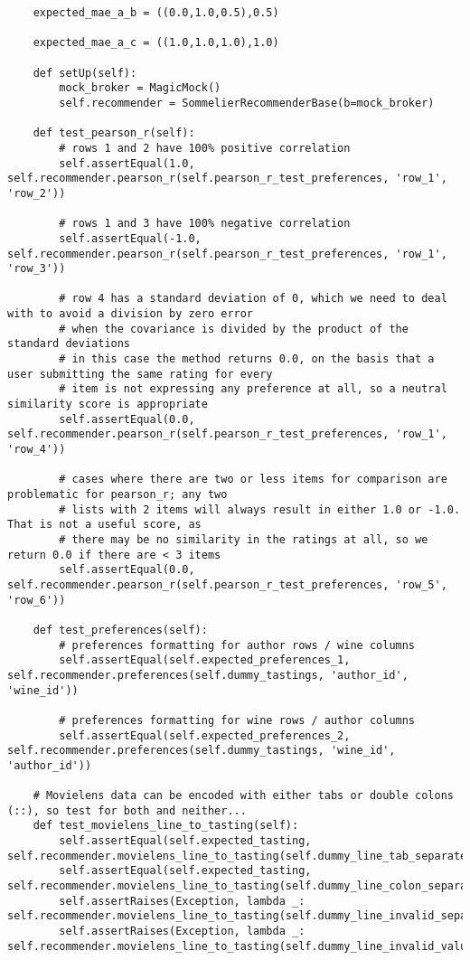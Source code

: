\begin{verbatim}
    expected_mae_a_b = ((0.0,1.0,0.5),0.5)

    expected_mae_a_c = ((1.0,1.0,1.0),1.0)

    def setUp(self):
        mock_broker = MagicMock()
        self.recommender = SommelierRecommenderBase(b=mock_broker)

    def test_pearson_r(self):
        # rows 1 and 2 have 100% positive correlation
        self.assertEqual(1.0, self.recommender.pearson_r(self.pearson_r_test_preferences, 'row_1', 'row_2'))

        # rows 1 and 3 have 100% negative correlation
        self.assertEqual(-1.0, self.recommender.pearson_r(self.pearson_r_test_preferences, 'row_1', 'row_3'))

        # row 4 has a standard deviation of 0, which we need to deal with to avoid a division by zero error
        # when the covariance is divided by the product of the standard deviations
        # in this case the method returns 0.0, on the basis that a user submitting the same rating for every 
        # item is not expressing any preference at all, so a neutral similarity score is appropriate
        self.assertEqual(0.0, self.recommender.pearson_r(self.pearson_r_test_preferences, 'row_1', 'row_4'))

        # cases where there are two or less items for comparison are problematic for pearson_r; any two
        # lists with 2 items will always result in either 1.0 or -1.0. That is not a useful score, as
        # there may be no similarity in the ratings at all, so we return 0.0 if there are < 3 items
        self.assertEqual(0.0, self.recommender.pearson_r(self.pearson_r_test_preferences, 'row_5', 'row_6'))

    def test_preferences(self):
        # preferences formatting for author rows / wine columns
        self.assertEqual(self.expected_preferences_1, self.recommender.preferences(self.dummy_tastings, 'author_id', 'wine_id')) 

        # preferences formatting for wine rows / author columns
        self.assertEqual(self.expected_preferences_2, self.recommender.preferences(self.dummy_tastings, 'wine_id', 'author_id')) 
    
    # Movielens data can be encoded with either tabs or double colons (::), so test for both and neither...
    def test_movielens_line_to_tasting(self):
        self.assertEqual(self.expected_tasting, self.recommender.movielens_line_to_tasting(self.dummy_line_tab_separated))
        self.assertEqual(self.expected_tasting, self.recommender.movielens_line_to_tasting(self.dummy_line_colon_separated))
        self.assertRaises(Exception, lambda _: self.recommender.movielens_line_to_tasting(self.dummy_line_invalid_separator))
        self.assertRaises(Exception, lambda _: self.recommender.movielens_line_to_tasting(self.dummy_line_invalid_values))


\end{verbatim}
